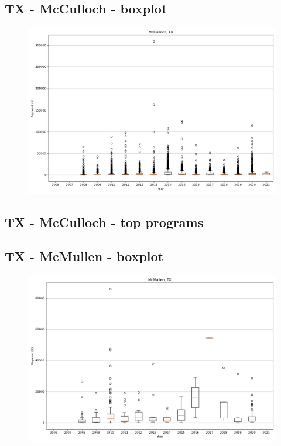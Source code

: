 \subsection*{TX - McCulloch - boxplot}
\begin{figure}[h]
\centering
\includegraphics[width=7in]{../output/boxplots/counties/McCulloch-TX_boxplot.png}
\end{figure}


\subsection*{TX - McCulloch - top programs}

\newpage
\subsection*{TX - McMullen - boxplot}
\begin{figure}[h]
\centering
\includegraphics[width=7in]{../output/boxplots/counties/McMullen-TX_boxplot.png}
\end{figure}


